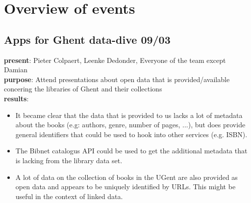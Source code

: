 \chapter{Overview of events}
\section{Apps for Ghent data-dive 09/03}
{\bf present}: Pieter Colpaert, Leenke Dedonder, Everyone of the team except Damian\\
{\bf purpose}: Attend presentations about open data that is provided/available concering the libraries of Ghent and their collections\\
{\bf results}:
\begin{itemize}
  \item It became clear that the data that is provided to us lacks a lot of metadata about the books (e.g: authors, genre, number of pages, ...), but does provide general identifiers that could be used to hook into other services (e.g. ISBN).
  \item The Bibnet catalogus API could be used to get the additional metadata that is lacking from the library data set.
  \item A lot of data on the collection of books in the UGent are also provided as open data and appears to be uniquely identified by URLs. This might be useful in the context of linked data.
\end{itemize}